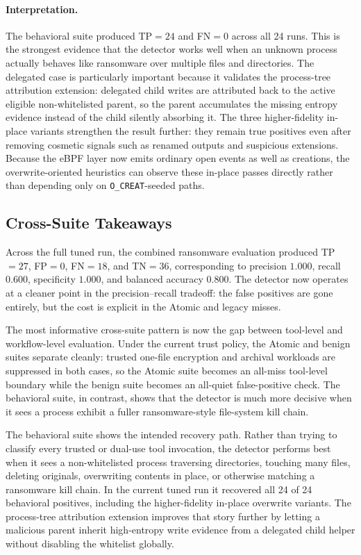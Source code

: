 \documentclass[twocolumn, 10pt]{scrartcl}
\begin{document}
\paragraph{Interpretation.}
The behavioral suite produced TP$=24$ and FN$=0$ across all 24 runs. This is the strongest evidence that the detector works well when an unknown process actually behaves like ransomware over multiple files and directories. The delegated case is particularly important because it validates the process-tree attribution extension: delegated child writes are attributed back to the active eligible non-whitelisted parent, so the parent accumulates the missing entropy evidence instead of the child silently absorbing it. The three higher-fidelity in-place variants strengthen the result further: they remain true positives even after removing cosmetic signals such as renamed outputs and suspicious extensions. Because the eBPF layer now emits ordinary open events as well as creations, the overwrite-oriented heuristics can observe these in-place passes directly rather than depending only on \texttt{O\_CREAT}-seeded paths.

\subsection{Cross-Suite Takeaways}
Across the full tuned run, the combined ransomware evaluation produced TP$=27$, FP$=0$, FN$=18$, and TN$=36$, corresponding to precision $1.000$, recall $0.600$, specificity $1.000$, and balanced accuracy $0.800$. The detector now operates at a cleaner point in the precision--recall tradeoff: the false positives are gone entirely, but the cost is explicit in the Atomic and legacy misses.

The most informative cross-suite pattern is now the gap between tool-level and workflow-level evaluation. Under the current trust policy, the Atomic and benign suites separate cleanly: trusted one-file encryption and archival workloads are suppressed in both cases, so the Atomic suite becomes an all-miss tool-level boundary while the benign suite becomes an all-quiet false-positive check. The behavioral suite, in contrast, shows that the detector is much more decisive when it sees a process exhibit a fuller ransomware-style file-system kill chain.

The behavioral suite shows the intended recovery path. Rather than trying to classify every trusted or dual-use tool invocation, the detector performs best when it sees a non-whitelisted process traversing directories, touching many files, deleting originals, overwriting contents in place, or otherwise matching a ransomware kill chain. In the current tuned run it recovered all 24 of 24 behavioral positives, including the higher-fidelity in-place overwrite variants. The process-tree attribution extension improves that story further by letting a malicious parent inherit high-entropy write evidence from a delegated child helper without disabling the whitelist globally.
\end{document}
